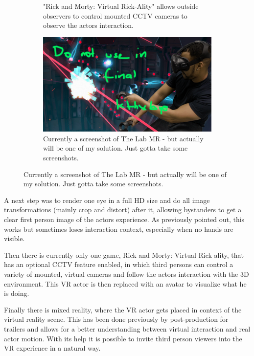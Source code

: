 \begin{figure}[htbp]
\begin{subfigure}[t]{.45\textwidth}
		\caption{"Rick and Morty: Virtual Rick-Ality" allows outside observers 
			to control mounted CCTV cameras to observe the actors interaction.}
	\end{subfigure}
	\begin{subfigure}[t]{.45\textwidth}
		\centering
		\includegraphics[width=\textwidth]{_raw_resources/the_lab_mr.png}
		\caption{Currently a screenshot of The Lab MR - but actually will be 
			one of my solution. Just gotta take some screenshots.}
	\end{subfigure}
\end{figure}

A next step was to render one eye in a full HD size and do all image 
transformations (mainly crop and distort) after it, allowing bystanders to get 
a clear first person image of the actors experience. As previously pointed out, 
this works but sometimes loses interaction context, especially when no hands 
are visible.

Then there is currently only one game, Rick and Morty: Virtual Rick-ality, that 
has an optional CCTV feature enabled, in which third persons can control a 
variety of mounted, virtual cameras and follow the actors interaction with the 
3D environment. This VR actor is then replaced with an avatar to visualize what 
he is doing.


Finally there is mixed reality, where the VR actor gets placed in context of 
the virtual reality scene. This has been done previously by post-production for 
trailers and allows for a better understanding between virtual interaction and 
real actor motion. With its help it is possible to invite third person viewers 
into the VR experience in a natural way.

